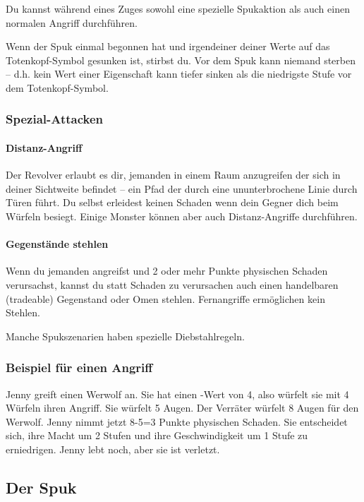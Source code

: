Du kannst während eines Zuges sowohl eine spezielle Spukaktion als auch einen normalen Angriff durchführen.

Wenn der Spuk einmal begonnen hat und irgendeiner deiner Werte auf das Totenkopf-Symbol gesunken ist, stirbst du. Vor dem Spuk kann niemand sterben – d.h. kein Wert einer Eigenschaft kann tiefer sinken als die niedrigste Stufe vor dem Totenkopf-Symbol.



\subsubsection{Spezial-Attacken}
\label{kap:rule:specialattack}

\paragraph{Distanz-Angriff} Der Revolver erlaubt es dir, jemanden in einem Raum anzugreifen der sich in deiner Sichtweite befindet – ein Pfad der durch eine ununterbrochene Linie durch Türen führt. Du selbst erleidest keinen Schaden wenn dein Gegner dich beim Würfeln besiegt. Einige Monster können aber auch Distanz-Angriffe durchführen.

\paragraph{Gegenstände stehlen} Wenn du jemanden angreifst und 2 oder mehr Punkte physischen Schaden verursachst, kannst du statt Schaden zu verursachen auch einen handelbaren (tradeable) Gegenstand oder Omen stehlen. Fernangriffe ermöglichen kein Stehlen.

Manche Spukszenarien haben spezielle Diebstahlregeln.

\subsubsection{Beispiel für einen Angriff}

Jenny greift einen Werwolf an. Sie hat einen \might-Wert von 4, also würfelt sie mit 4 Würfeln ihren Angriff. Sie würfelt 5 Augen. Der Verräter würfelt 8 Augen für den Werwolf. Jenny nimmt jetzt 8-5=3 Punkte physischen Schaden. Sie entscheidet sich, ihre Macht um 2 Stufen und ihre Geschwindigkeit um 1 Stufe zu erniedrigen. Jenny lebt noch, aber sie ist verletzt.

\subsection{Der Spuk}
\label{kap:rule:haunt}

